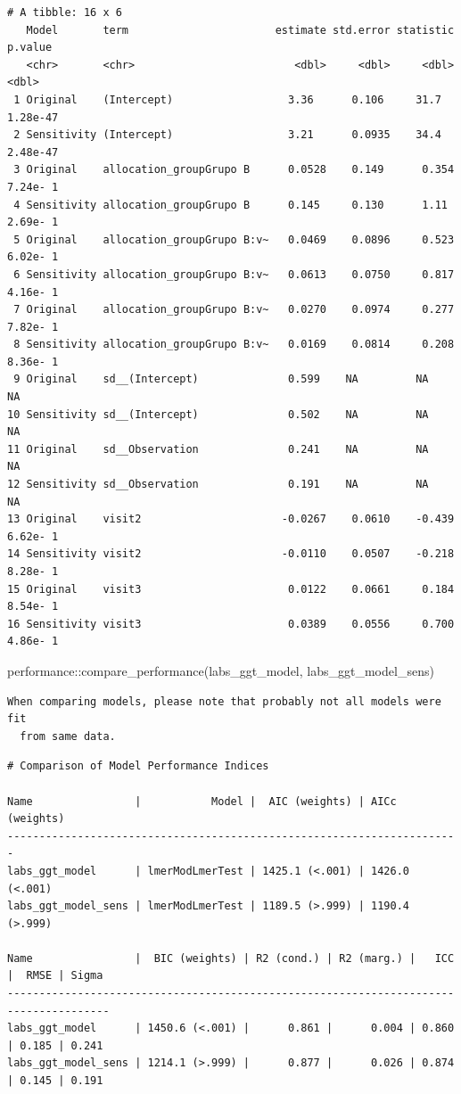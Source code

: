 \documentclass[
  letterpaper,
  DIV=11,
  numbers=noendperiod]{scrartcl}
\newenvironment{Shaded}{\begin{snugshade}}{\end{snugshade}}
\newcommand{\FunctionTok}[1]{\textcolor[rgb]{0.28,0.35,0.67}{#1}}
\newcommand{\NormalTok}[1]{\textcolor[rgb]{0.00,0.23,0.31}{#1}}
\newcommand{\SpecialCharTok}[1]{\textcolor[rgb]{0.37,0.37,0.37}{#1}}
\begin{document}
\begin{verbatim}
# A tibble: 16 x 6
   Model       term                       estimate std.error statistic   p.value
   <chr>       <chr>                         <dbl>     <dbl>     <dbl>     <dbl>
 1 Original    (Intercept)                  3.36      0.106     31.7    1.28e-47
 2 Sensitivity (Intercept)                  3.21      0.0935    34.4    2.48e-47
 3 Original    allocation_groupGrupo B      0.0528    0.149      0.354  7.24e- 1
 4 Sensitivity allocation_groupGrupo B      0.145     0.130      1.11   2.69e- 1
 5 Original    allocation_groupGrupo B:v~   0.0469    0.0896     0.523  6.02e- 1
 6 Sensitivity allocation_groupGrupo B:v~   0.0613    0.0750     0.817  4.16e- 1
 7 Original    allocation_groupGrupo B:v~   0.0270    0.0974     0.277  7.82e- 1
 8 Sensitivity allocation_groupGrupo B:v~   0.0169    0.0814     0.208  8.36e- 1
 9 Original    sd__(Intercept)              0.599    NA         NA     NA       
10 Sensitivity sd__(Intercept)              0.502    NA         NA     NA       
11 Original    sd__Observation              0.241    NA         NA     NA       
12 Sensitivity sd__Observation              0.191    NA         NA     NA       
13 Original    visit2                      -0.0267    0.0610    -0.439  6.62e- 1
14 Sensitivity visit2                      -0.0110    0.0507    -0.218  8.28e- 1
15 Original    visit3                       0.0122    0.0661     0.184  8.54e- 1
16 Sensitivity visit3                       0.0389    0.0556     0.700  4.86e- 1
\end{verbatim}

\begin{Shaded}
\begin{Highlighting}[]
\NormalTok{performance}\SpecialCharTok{::}\FunctionTok{compare\_performance}\NormalTok{(labs\_ggt\_model, labs\_ggt\_model\_sens)}
\end{Highlighting}
\end{Shaded}

\begin{verbatim}
When comparing models, please note that probably not all models were fit
  from same data.
\end{verbatim}

\begin{verbatim}
# Comparison of Model Performance Indices

Name                |           Model |  AIC (weights) | AICc (weights)
-----------------------------------------------------------------------
labs_ggt_model      | lmerModLmerTest | 1425.1 (<.001) | 1426.0 (<.001)
labs_ggt_model_sens | lmerModLmerTest | 1189.5 (>.999) | 1190.4 (>.999)

Name                |  BIC (weights) | R2 (cond.) | R2 (marg.) |   ICC |  RMSE | Sigma
--------------------------------------------------------------------------------------
labs_ggt_model      | 1450.6 (<.001) |      0.861 |      0.004 | 0.860 | 0.185 | 0.241
labs_ggt_model_sens | 1214.1 (>.999) |      0.877 |      0.026 | 0.874 | 0.145 | 0.191
\end{verbatim}
\end{document}
